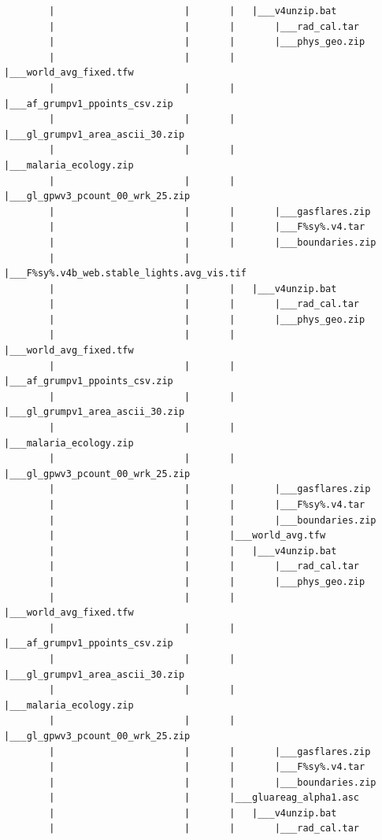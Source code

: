 \documentclass[]{book}
\begin{document}
\begin{verbatim}
        |                       |       |   |___v4unzip.bat
        |                       |       |       |___rad_cal.tar
        |                       |       |       |___phys_geo.zip
        |                       |       |       |___world_avg_fixed.tfw
        |                       |       |       |___af_grumpv1_ppoints_csv.zip
        |                       |       |       |___gl_grumpv1_area_ascii_30.zip
        |                       |       |       |___malaria_ecology.zip
        |                       |       |       |___gl_gpwv3_pcount_00_wrk_25.zip
        |                       |       |       |___gasflares.zip
        |                       |       |       |___F%sy%.v4.tar
        |                       |       |       |___boundaries.zip
        |                       |       |___F%sy%.v4b_web.stable_lights.avg_vis.tif
        |                       |       |   |___v4unzip.bat
        |                       |       |       |___rad_cal.tar
        |                       |       |       |___phys_geo.zip
        |                       |       |       |___world_avg_fixed.tfw
        |                       |       |       |___af_grumpv1_ppoints_csv.zip
        |                       |       |       |___gl_grumpv1_area_ascii_30.zip
        |                       |       |       |___malaria_ecology.zip
        |                       |       |       |___gl_gpwv3_pcount_00_wrk_25.zip
        |                       |       |       |___gasflares.zip
        |                       |       |       |___F%sy%.v4.tar
        |                       |       |       |___boundaries.zip
        |                       |       |___world_avg.tfw
        |                       |       |   |___v4unzip.bat
        |                       |       |       |___rad_cal.tar
        |                       |       |       |___phys_geo.zip
        |                       |       |       |___world_avg_fixed.tfw
        |                       |       |       |___af_grumpv1_ppoints_csv.zip
        |                       |       |       |___gl_grumpv1_area_ascii_30.zip
        |                       |       |       |___malaria_ecology.zip
        |                       |       |       |___gl_gpwv3_pcount_00_wrk_25.zip
        |                       |       |       |___gasflares.zip
        |                       |       |       |___F%sy%.v4.tar
        |                       |       |       |___boundaries.zip
        |                       |       |___gluareag_alpha1.asc
        |                       |       |   |___v4unzip.bat
        |                       |       |       |___rad_cal.tar

\end{verbatim}
\end{document}
